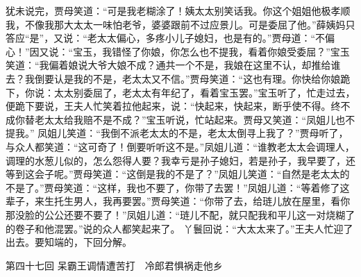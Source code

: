 \documentclass[12pt,oneside]{book}
\begin{document}
犹未说完，贾母笑道：“可是我老糊涂了！姨太太别笑话我。你这个姐姐他极孝顺我，不像我那大太太一味怕老爷，婆婆跟前不过应景儿。可是委屈了他。”薛姨妈只答应“是”，又说：“老太太偏心，多疼小儿子媳妇，也是有的。”贾母道：“不偏心！”因又说：“宝玉，我错怪了你娘，你怎么也不提我，看着你娘受委屈？”宝玉笑道：“我偏着娘说大爷大娘不成？通共一个不是，我娘在这里不认，却推给谁去？我倒要认是我的不是，老太太又不信。”贾母笑道：“这也有理。你快给你娘跪下，你说：太太别委屈了，老太太有年纪了，看着宝玉罢。”宝玉听了，忙走过去，便跪下要说，王夫人忙笑着拉他起来，说：“快起来，快起来，断乎使不得。终不成你替老太太给我赔不是不成？”宝玉听说，忙站起来。贾母又笑道：“凤姐儿也不提我。”
凤姐儿笑道：“我倒不派老太太的不是，老太太倒寻上我了？”贾母听了，与众人都笑道：“这可奇了！倒要听听这不是。”凤姐儿道：“谁教老太太会调理人，调理的水葱儿似的，怎么怨得人要？我幸亏是孙子媳妇，若是孙子，我早要了，还等到这会子呢。”贾母笑道：“这倒是我的不是了？”凤姐儿笑道：“自然是老太太的不是了。”贾母笑道：“这样，我也不要了，你带了去罢！”凤姐儿道：“等着修了这辈子，来生托生男人，我再要罢。”贾母笑道：“你带了去，给琏儿放在屋里，看你那没脸的公公还要不要了！”凤姐儿道：“琏儿不配，就只配我和平儿这一对烧糊了的卷子和他混罢。”说的众人都笑起来了。
丫鬟回说：“大太太来了。”王夫人忙迎了出去。要知端的，下回分解。 

















 
第四十七回  呆霸王调情遭苦打　冷郎君惧祸走他乡
\end{document}
